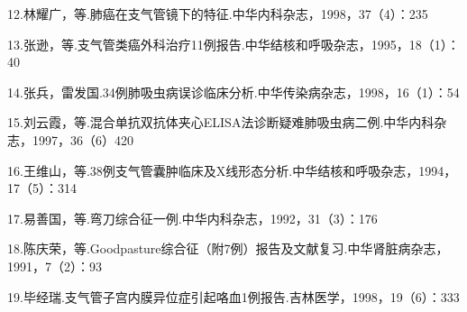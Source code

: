 12.林耀广，等.肺癌在支气管镜下的特征.中华内科杂志，1998，37（4）：235

13.张逊，等.支气管类癌外科治疗11例报告.中华结核和呼吸杂志，1995，18（1）：40

14.张兵，雷发国.34例肺吸虫病误诊临床分析.中华传染病杂志，1998，16（1）：54

15.刘云霞，等.混合单抗双抗体夹心ELISA法诊断疑难肺吸虫病二例.中华内科杂志，1997，36（6）420

16.王维山，等.38例支气管囊肿临床及X线形态分析.中华结核和呼吸杂志，1994，17（5）：314

17.易善国，等.弯刀综合征一例.中华内科杂志，1992，31（3）：176

18.陈庆荣，等.Goodpasture综合征（附7例）报告及文献复习.中华肾脏病杂志，1991，7（2）：93

19.毕经瑞.支气管子宫内膜异位症引起咯血1例报告.吉林医学，1998，19（6）：333

\protect\hypertarget{text00062.html}{}{}

